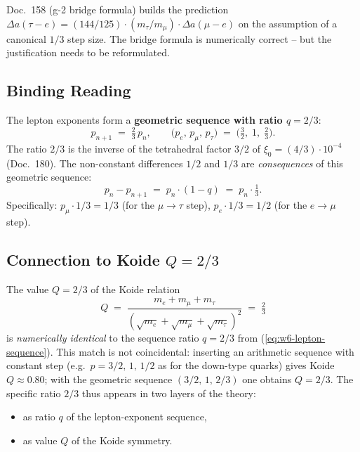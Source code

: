 Doc.~158 (g-2 bridge formula) builds the prediction
$\Delta a(\tau{-}e) = (144/125) \cdot (m_\tau/m_\mu) \cdot \Delta a(\mu{-}e)$
on the assumption of a canonical $1/3$ step size. The bridge formula
is numerically correct -- but the justification needs to be reformulated.

\subsection*{Binding Reading}

The lepton exponents form a \textbf{geometric sequence with ratio
$q = 2/3$}:
\begin{equation}
  p_{n+1} \;=\; \tfrac{2}{3}\, p_n,
  \qquad
  \bigl(p_e,\, p_\mu,\, p_\tau\bigr)
  \;=\; \bigl(\tfrac{3}{2},\;1,\;\tfrac{2}{3}\bigr).
  \label{eq:w6-lepton-sequence}
\end{equation}
The ratio $2/3$ is the inverse of the tetrahedral factor $3/2$ of
$\xi_0 = (4/3) \cdot 10^{-4}$ (Doc.~180). The non-constant
differences $1/2$ and $1/3$ are \emph{consequences} of this geometric
sequence:
\begin{equation}
  p_n - p_{n+1} \;=\; p_n \cdot (1 - q) \;=\; p_n \cdot \tfrac{1}{3}.
\end{equation}
Specifically: $p_\mu \cdot 1/3 = 1/3$ (for the $\mu \to \tau$ step),
$p_e \cdot 1/3 = 1/2$ (for the $e \to \mu$ step).

\subsection*{Connection to Koide $Q = 2/3$}

The value $Q = 2/3$ of the Koide relation
\begin{equation}
  Q \;=\; \frac{m_e + m_\mu + m_\tau}{(\sqrt{m_e}+\sqrt{m_\mu}+\sqrt{m_\tau})^2}
  \;=\; \tfrac{2}{3}
\end{equation}
is \emph{numerically identical} to the sequence ratio $q = 2/3$ from
(\ref{eq:w6-lepton-sequence}). This match is not coincidental:
inserting an arithmetic sequence with constant step (e.g.\
$p = 3/2,\,1,\,1/2$ as for the down-type quarks) gives Koide
$Q \approx 0.80$; with the geometric sequence $(3/2,\,1,\,2/3)$ one
obtains $Q = 2/3$. The specific ratio $2/3$ thus appears in two
layers of the theory:
\begin{itemize}[leftmargin=2em,itemsep=2pt,topsep=2pt]
  \item as ratio $q$ of the lepton-exponent sequence,
  \item as value $Q$ of the Koide symmetry.
\end{itemize}

